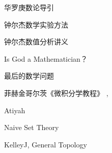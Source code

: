 \documentclass[main.tex]{subfiles}
\begin{document}
华罗庚数论导引
\cite[p.~1]{HuaL}

钟尔杰数学实验方法 \cite{ZhongEr1}

钟尔杰数值分析讲义 \cite{ZhongEr2}

Is God a Mathematician？\cite{LivioM}

最后的数学问题 \cite{LivioM2}

菲赫金哥尔茨《微积分学教程》\cite{FeiH1}
\cite{FeiH2}, \cite{FeiH3}

Atiyah \cite{AM69}

Naive Set Theory \cite{HalmosP}

KelleyJ, General Topology \cite{KelleyJ}
	
	
\end{document}
